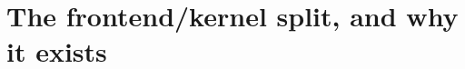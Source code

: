 \chapter{The frontend/kernel split, and why it exists}
\label{ch:the-frontend-kernel-split-and-why-it}


